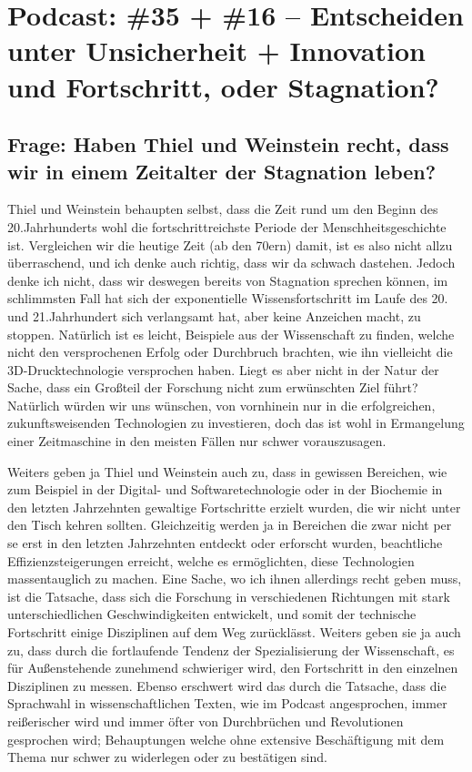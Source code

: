 \documentclass[twoside, a4paper, DIV=11, open=any, bibliography=totoc]{scrbook}
\begin{document}
\section{Podcast: \#35 + \#16 -- Entscheiden unter Unsicherheit +
Innovation und Fortschritt, oder Stagnation?}

\subsection{Frage: Haben Thiel und Weinstein recht, dass wir in einem Zeitalter der Stagnation leben?}

Thiel und Weinstein behaupten selbst, dass die Zeit rund um den Beginn des 20.Jahrhunderts
wohl die fortschrittreichste Periode der Menschheitsgeschichte ist.
Vergleichen wir die heutige Zeit (ab den 70ern) damit, ist es also nicht allzu überraschend,
und ich denke auch richtig, dass wir da schwach dastehen.
Jedoch denke ich nicht, dass wir deswegen bereits von Stagnation sprechen können,
im schlimmsten Fall hat sich der exponentielle Wissensfortschritt im Laufe
des 20. und 21.Jahrhundert sich verlangsamt hat, aber keine Anzeichen macht, zu stoppen.
Natürlich ist es leicht, Beispiele aus der Wissenschaft zu finden, welche nicht
den versprochenen Erfolg oder Durchbruch brachten, wie ihn vielleicht die
3D-Drucktechnologie versprochen haben. Liegt es aber nicht in der Natur der Sache,
dass ein Großteil der Forschung nicht zum erwünschten Ziel führt?
Natürlich würden wir uns wünschen, von vornhinein nur in die erfolgreichen, zukunftsweisenden
Technologien zu investieren, doch das ist wohl in Ermangelung einer Zeitmaschine
in den meisten Fällen nur schwer vorauszusagen.


Weiters geben ja Thiel und Weinstein auch zu, dass in gewissen Bereichen, wie
zum Beispiel in der Digital- und Softwaretechnologie oder in der Biochemie
in den letzten Jahrzehnten gewaltige
Fortschritte erzielt wurden, die wir nicht unter den Tisch kehren sollten.
Gleichzeitig werden ja in Bereichen die zwar nicht per se erst in den letzten
Jahrzehnten entdeckt oder erforscht wurden, beachtliche Effizienzsteigerungen erreicht,
welche es ermöglichten, diese Technologien massentauglich zu machen.
Eine Sache, wo ich ihnen allerdings recht geben muss, ist die Tatsache, dass sich die
Forschung in verschiedenen Richtungen mit stark unterschiedlichen Geschwindigkeiten
entwickelt, und somit der technische Fortschritt einige Disziplinen auf dem Weg zurücklässt.
Weiters geben sie ja auch zu, dass durch die fortlaufende Tendenz der Spezialisierung
der Wissenschaft, es für Außenstehende zunehmend schwieriger wird, den Fortschritt
in den einzelnen Disziplinen zu messen. Ebenso erschwert wird das durch die Tatsache,
dass die Sprachwahl in wissenschaftlichen Texten, wie im Podcast angesprochen,
immer reißerischer wird und immer öfter von Durchbrüchen und Revolutionen gesprochen
wird; Behauptungen welche ohne extensive Beschäftigung mit dem Thema nur schwer
zu widerlegen oder zu bestätigen sind.
\end{document}

